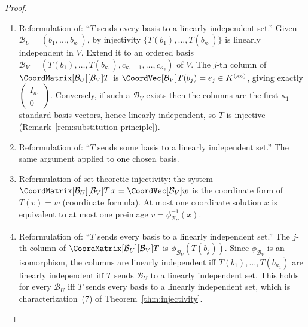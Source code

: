 \begin{proof}
    \leavevmode
    \begin{enumerate}
        \item Reformulation of: ``$T$ sends every basis to a linearly independent set.''
              Given $\mathcal{B}_U = (b_1, \ldots, b_{\kappa_1})$, by injectivity
              $\{T(b_1), \ldots, T(b_{\kappa_1})\}$ is linearly independent in $V$. Extend
              it to an ordered basis
              $\mathcal{B}_V = (T(b_1), \ldots, T(b_{\kappa_1}),
              c_{\kappa_1+1}, \ldots, c_{\kappa_2})$ of $V$.
              The $j$-th column of $\CoordMatrix[\mathcal{B}_U][\mathcal{B}_V]{T}$ is
              $\CoordVec[\mathcal{B}_V]{T(b_j)} = e_j \in K^{(\kappa_2)}$, giving exactly
              $\begin{pmatrix} I_{\kappa_1} \\ 0 \end{pmatrix}$. Conversely, if such a
              $\mathcal{B}_V$ exists then the columns are the first $\kappa_1$ standard
              basis vectors, hence linearly independent, so $T$ is injective
              (Remark~\ref{rem:substitution-principle}).

        \item Reformulation of: ``$T$ sends some basis to a linearly independent set.''
              The same argument applied to one chosen basis.

        \item Reformulation of set-theoretic injectivity: the system
              $\CoordMatrix[\mathcal{B}_U][\mathcal{B}_V]{T}\, x
              = \CoordVec[\mathcal{B}_V]{w}$
              is the coordinate form of $T(v) = w$ (coordinate formula). At most one
              coordinate solution $x$ is equivalent to at most one preimage
              $v = \phi_{\mathcal{B}_U}^{-1}(x)$.

        \item Reformulation of: ``$T$ sends every basis to a linearly independent set.''
              The $j$-th column of $\CoordMatrix[\mathcal{B}_U][\mathcal{B}_V]{T}$ is
              $\phi_{\mathcal{B}_V}(T(b_j))$.
              Since $\phi_{\mathcal{B}_V}$ is an isomorphism, the columns are linearly
              independent iff $T(b_1), \ldots, T(b_{\kappa_1})$ are linearly independent
              iff $T$ sends $\mathcal{B}_U$ to a linearly independent set.
              This holds for every $\mathcal{B}_U$ iff $T$ sends every basis to a linearly
              independent set, which is characterization~(7) of
              Theorem~\ref{thm:injectivity}. \qedhere
    \end{enumerate}
\end{proof}

